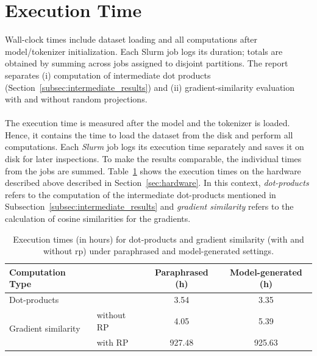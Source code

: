 \section{Execution Time}\label{sec:exec_time}
Wall-clock times include dataset loading and all computations after model/tokenizer initialization. Each Slurm job logs its duration; totals are obtained by summing across jobs assigned to disjoint partitions. The report separates (i) computation of intermediate dot products (Section~\ref{subsec:intermediate_results}) and (ii) gradient-similarity evaluation with and without random projections.
\\\\
The execution time is measured after the model and the tokenizer is loaded. Hence, it contains the time to load the dataset from the disk and perform all computations. Each \emph{Slurm} job logs its execution time separately and saves it on disk for later inspections. To make the results comparable, the individual times from the jobs are summed. Table~\ref{tab:execution_times} shows the execution times on the hardware described above described in Section~\ref{sec:hardware}. In this context, \emph{dot-products} refers to the computation of the intermediate dot-products mentioned in Subsection~\ref{subsec:intermediate_results} and \emph{gradient similarity} refers to the calculation of cosine similarities for the gradients. 
\begin{table}[h]
    \centering
    \begin{tabular}{|l l|c|c|}
        \hline
        \textbf{Computation Type} & & \textbf{Paraphrased (h)} & \textbf{Model-generated (h)} \\
        \hline
        Dot-products & & 3.54 & 3.35 \\
        \hline
        \multirow{2}{*}{Gradient similarity} 
            & without RP & 4.05 & 5.39 \\
            & with RP & 927.48 & 925.63 \\
        \hline
    \end{tabular}
    \caption{Execution times (in hours) for dot-products and gradient similarity (with and without \acrfull{rp}) under paraphrased and model-generated settings.}
    \label{tab:execution_times}
\end{table}
